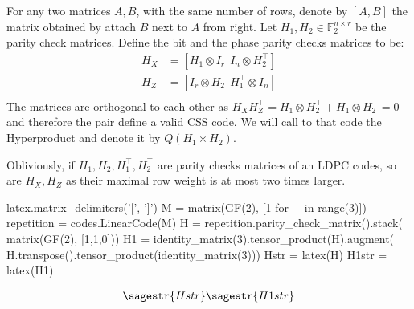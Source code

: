 \begin{definition}
  For any two matrices $A,B$, with the same number of rows, denote by $\left[ A,B \right]$ the matrix obtained by attach $B$ next to $A$ from right.  Let $H_{1}, H_{2} \in \mathbb{F}_{2}^{n\times r}$ be the parity check matrices. Define the bit and the phase parity checks matrices to be:          
\begin{equation*}
  \begin{split}
    H_{X} &= \left[ H_{1} \otimes I_{r} \ \  I_{n} \otimes H^{\top}_{2} \right] \\ 
    H_{Z} &= \left[ I_{r} \otimes H_{2} \ \  H_{1}^{\top} \otimes I_{n} \right] \\ 
  \end{split}
  \label{equ:css}
\end{equation*}
The matrices are orthogonal to each other as $H_{X}H_{Z}^{\top} = H_{1}\otimes H^{\top}_{2} + H_{1}\otimes H^{\top}_{2} = 0$ and therefore the pair define a valid CSS code. We will call to that code the Hyperproduct and denote it by $Q\left( H_{1} \times H_{2} \right)$.
\end{definition}
Obliviously, if $H_{1},H_{2},H_{1}^{\top},H_{2}^{\top}$ are parity checks matrices of an LDPC codes, so are $H_{X},H_{Z}$ as their maximal row weight is at most two times larger.   


\begin{sagesilent}
latex.matrix_delimiters('[', ']')
M = matrix(GF(2), [1 for _ in range(3)])
repetition = codes.LinearCode(M)
H = repetition.parity_check_matrix().stack( matrix(GF(2), [1,1,0]))
H1 = identity_matrix(3).tensor_product(H).augment( H.transpose().tensor_product(identity_matrix(3)))
Hstr = latex(H)
H1str = latex(H1)
\end{sagesilent}
 
\begin{equation*}
  \begin{split}
    \sagestr{Hstr} \sagestr{H1str} 
  \end{split}
\end{equation*}


